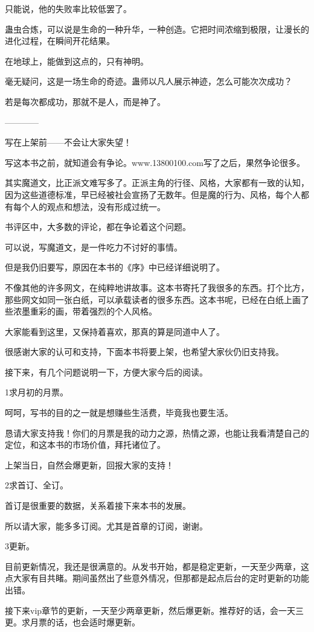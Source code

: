 \begin{this_body}
只能说，他的失败率比较低罢了。

蛊虫合炼，可以说是生命的一种升华，一种创造。它把时间浓缩到极限，让漫长的进化过程，在瞬间开花结果。

在地球上，能做到这点的，只有神明。

毫无疑问，这是一场生命的奇迹。蛊师以凡人展示神迹，怎么可能次次成功？

若是每次都成功，那就不是人，而是神了。

------------

写在上架前——不会让大家失望！

写这本书之前，就知道会有争论。www.13800100.com写了之后，果然争论很多。

其实魔道文，比正派文难写多了。正派主角的行径、风格，大家都有一致的认知，因为这些道德标准，早已经被社会宣扬了无数年。但是魔的行为、风格，每个人都有每个人的观点和想法，没有形成过统一。

书评区中，大多数的评论，都在争论着这个问题。

可以说，写魔道文，是一件吃力不讨好的事情。

但是我仍旧要写，原因在本书的《序》中已经详细说明了。

不像其他的许多网文，在纯粹地讲故事。这本书寄托了我很多的东西。打个比方，那些网文如同一张白纸，可以承载读者的很多东西。这本书呢，已经在白纸上画了些浓墨重彩的画，带着强烈的个人风格。

大家能看到这里，又保持着喜欢，那真的算是同道中人了。

很感谢大家的认可和支持，下面本书将要上架，也希望大家伙仍旧支持我。

接下来，有几个问题说明一下，方便大家今后的阅读。

1求月初的月票。

呵呵，写书的目的之一就是想赚些生活费，毕竟我也要生活。

恳请大家支持我！你们的月票是我的动力之源，热情之源，也能让我看清楚自己的定位，和这本书的市场价值，拜托诸位了。

上架当日，自然会爆更新，回报大家的支持！

2求首订、全订。

首订是很重要的数据，关系着接下来本书的发展。

所以请大家，能多多订阅。尤其是首章的订阅，谢谢。

3更新。

目前更新情况，我还是很满意的。从发书开始，都是稳定更新，一天至少两章，这点大家有目共睹。期间虽然出了些意外情况，但那都是起点后台的定时更新的功能出错。

接下来vip章节的更新，一天至少两章更新，然后爆更新。推荐好的话，会一天三更。求月票的话，也会适时爆更新。


\end{this_body}
